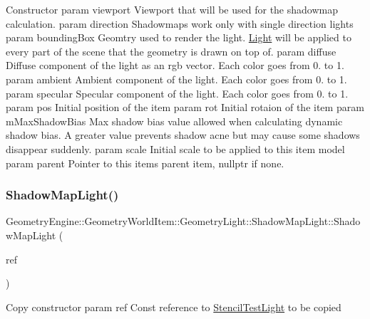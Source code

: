 Constructor param viewport Viewport that will be used for the shadowmap calculation. param direction Shadowmaps work only with single direction lights param bounding\+Box Geomtry used to render the light. \mbox{\hyperlink{class_geometry_engine_1_1_geometry_world_item_1_1_geometry_light_1_1_light}{Light}} will be applied to every part of the scene that the geometry is drawn on top of. param diffuse Diffuse component of the light as an rgb vector. Each color goes from 0. to 1. param ambient Ambient component of the light. Each color goes from 0. to 1. param specular Specular component of the light. Each color goes from 0. to 1. param pos Initial position of the item param rot Initial rotaion of the item param m\+Max\+Shadow\+Bias Max shadow bias value allowed when calculating dynamic shadow bias. A greater value prevents shadow acne but may cause some shadows disappear suddenly. param scale Initial scale to be applied to this item model param parent Pointer to this items parent item, nullptr if none. \mbox{\label{class_geometry_engine_1_1_geometry_world_item_1_1_geometry_light_1_1_shadow_map_light_a2879b30ef1f4ff318fd55f600001f70f}} 
\subsubsection{\texorpdfstring{ShadowMapLight()}{ShadowMapLight()}\hspace{0.1cm}{\footnotesize\ttfamily [2/2]}}
{\footnotesize\ttfamily Geometry\+Engine\+::\+Geometry\+World\+Item\+::\+Geometry\+Light\+::\+Shadow\+Map\+Light\+::\+Shadow\+Map\+Light (\begin{DoxyParamCaption}\item[{const \mbox{\hyperlink{class_geometry_engine_1_1_geometry_world_item_1_1_geometry_light_1_1_shadow_map_light}{Shadow\+Map\+Light}} \&}]{ref }\end{DoxyParamCaption})\hspace{0.3cm}{\ttfamily [inline]}}

Copy constructor param ref Const reference to \mbox{\hyperlink{class_geometry_engine_1_1_geometry_world_item_1_1_geometry_light_1_1_stencil_test_light}{Stencil\+Test\+Light}} to be copied 

